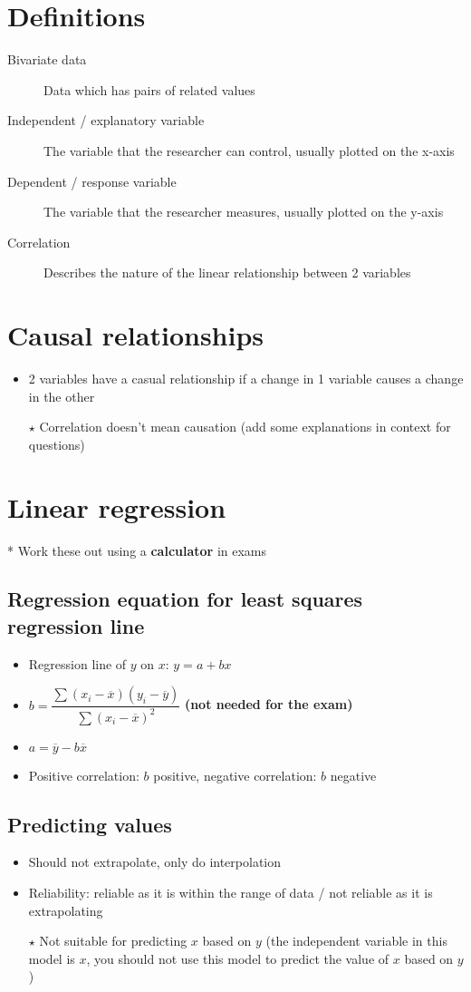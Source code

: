 \section{Definitions}
\begin{description}
	\item[Bivariate data] Data which has pairs of related values
	\item[Independent / explanatory variable] The variable that the researcher can control, usually plotted on the x-axis
	\item[Dependent / response variable] The variable that the researcher measures, usually plotted on the y-axis
	\item[Correlation] Describes the nature of the linear relationship between 2 variables
\end{description}

\section{Causal relationships}
\begin{itemize}
	\item 2 variables have a casual relationship if a change in 1 variable causes a change in the other
	\item[$\star$] Correlation doesn't mean causation (add some explanations in context for questions)
\end{itemize}

\section{Linear regression}
* Work these out using a \textbf{calculator} in exams
\subsection{Regression equation for least squares regression line}
\begin{itemize}
	\item Regression line of $y$ on $x$: $y=a+bx$
	\item $b=\dfrac{\sum (x_i-\overline{x}) (y_i-\overline{y})}{\sum (x_i-\overline{x})^2}$ \textbf{(not needed for the exam)}
	\item $a=\overline{y}-b\overline{x}$
	\item Positive correlation: $b$ positive, negative correlation: $b$ negative
\end{itemize}

\subsection{Predicting values}
\begin{itemize}
	\item Should not extrapolate, only do interpolation
	\item Reliability: reliable as it is within the range of data / not reliable as it is extrapolating
	\item[$\star$] Not suitable for predicting $x$ based on $y$ (the independent variable in this model is $x$, you should not use this model to predict the value of $x$ based on $y$)
\end{itemize}

